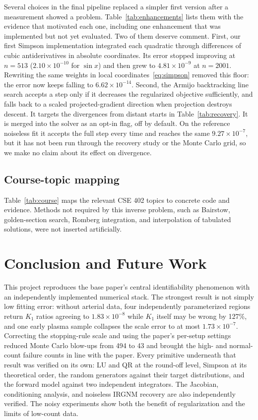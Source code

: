 \documentclass[sigconf,nonacm]{acmart}
\newcommand{\sci}[2]{\ensuremath{#1\times10^{#2}}}
\begin{document}
Several choices in the final pipeline replaced a simpler first version after a measurement showed a problem. Table~\ref{tab:enhancements} lists them with the evidence that motivated each one, including one enhancement that was implemented but not yet evaluated. Two of them deserve comment. First, our first Simpson implementation integrated each quadratic through differences of cubic antiderivatives in absolute coordinates. Its error stopped improving at $n=513$ (\sci{2.10}{-10} for $\sin x$) and then grew to \sci{4.81}{-9} at $n=2001$. Rewriting the same weights in local coordinates~\eqref{eq:simpson} removed this floor: the error now keeps falling to \sci{6.62}{-14}. Second, the Armijo backtracking line search accepts a step only if it decreases the regularized objective sufficiently, and falls back to a scaled projected-gradient direction when projection destroys descent. It targets the divergences from distant starts in Table~\ref{tab:recovery}. It is merged into the solver as an opt-in flag, off by default. On the reference noiseless fit it accepts the full step every time and reaches the same $9.27\times10^{-7}$, but it has not been run through the recovery study or the Monte Carlo grid, so we make no claim about its effect on divergence.

\subsection{Course-topic mapping}

Table~\ref{tab:course} maps the relevant CSE 402 topics to concrete code and evidence. Methods not required by this inverse problem, such as Bairstow, golden-section search, Romberg integration, and interpolation of tabulated solutions, were not inserted artificially.

\section{Conclusion and Future Work}

This project reproduces the base paper's central identifiability phenomenon with an independently implemented numerical stack. The strongest result is not simply low fitting error: without arterial data, four independently parameterized regions return $K_1$ ratios agreeing to $1.83\times10^{-8}$ while $K_1$ itself may be wrong by 127\%, and one early plasma sample collapses the scale error to at most $1.73\times10^{-7}$. Correcting the stopping-rule scale and using the paper's per-setup settings reduced Monte Carlo blow-ups from 494 to 43 and brought the high- and normal-count failure counts in line with the paper. Every primitive underneath that result was verified on its own: LU and QR at the round-off level, Simpson at its theoretical order, the random generators against their target distributions, and the forward model against two independent integrators. The Jacobian, conditioning analysis, and noiseless IRGNM recovery are also independently verified. The noisy experiments show both the benefit of regularization and the limits of low-count data.
\end{document}
